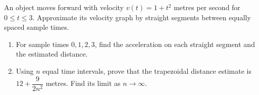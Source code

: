 An object moves forward with velocity $v(t)=1+t^2$ metres per second for $0\le t\le3$. Approximate its velocity graph by straight segments between equally spaced sample times.
\begin{enumerate}
\item For sample times $0,1,2,3$, find the acceleration on each straight segment and the estimated distance.
\item Using $n$ equal time intervals, prove that the trapezoidal distance estimate is $12+\dfrac{9}{2n^2}$ metres. Find its limit as $n\to\infty$.
\end{enumerate}
